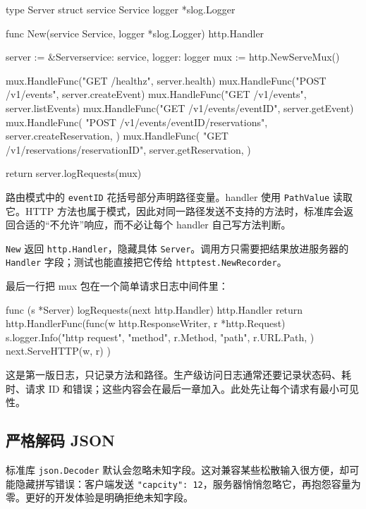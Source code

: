 \begin{gocode}[title={代码清单 12.25 \texttt{server.go}：注册 SeatKeeper 路由}]
type Server struct {
    service Service
    logger  *slog.Logger
}

func New(service Service, logger *slog.Logger) http.Handler {
    server := &Server{service: service, logger: logger}
    mux := http.NewServeMux()

    mux.HandleFunc("GET /healthz", server.health)
    mux.HandleFunc("POST /v1/events", server.createEvent)
    mux.HandleFunc("GET /v1/events", server.listEvents)
    mux.HandleFunc("GET /v1/events/{eventID}", server.getEvent)
    mux.HandleFunc(
        "POST /v1/events/{eventID}/reservations",
        server.createReservation,
    )
    mux.HandleFunc(
        "GET /v1/reservations/{reservationID}",
        server.getReservation,
    )

    return server.logRequests(mux)
}
\end{gocode}

路由模式中的 \texttt{eventID} 花括号部分声明路径变量。handler 使用 \texttt{PathValue} 读取它。HTTP 方法也属于模式，因此对同一路径发送不支持的方法时，标准库会返回合适的“不允许”响应，而不必让每个 handler 自己写方法判断。

\texttt{New} 返回 \texttt{http.Handler}，隐藏具体 \texttt{Server}。调用方只需要把结果放进服务器的 \texttt{Handler} 字段；测试也能直接把它传给 \texttt{httptest.NewRecorder}。

最后一行把 mux 包在一个简单请求日志中间件里：

\begin{gocode}[]
func (s *Server) logRequests(next http.Handler) http.Handler {
    return http.HandlerFunc(func(w http.ResponseWriter, r *http.Request) {
        s.logger.Info("http request",
            "method", r.Method,
            "path", r.URL.Path,
        )
        next.ServeHTTP(w, r)
    })
}
\end{gocode}

这是第一版日志，只记录方法和路径。生产级访问日志通常还要记录状态码、耗时、请求 ID 和错误；这些内容会在最后一章加入。此处先让每个请求有最小可见性。

\subsection{严格解码 JSON}

标准库 \texttt{json.Decoder} 默认会忽略未知字段。这对兼容某些松散输入很方便，却可能隐藏拼写错误：客户端发送 \texttt{"capcity": 12}，服务器悄悄忽略它，再抱怨容量为零。更好的开发体验是明确拒绝未知字段。

